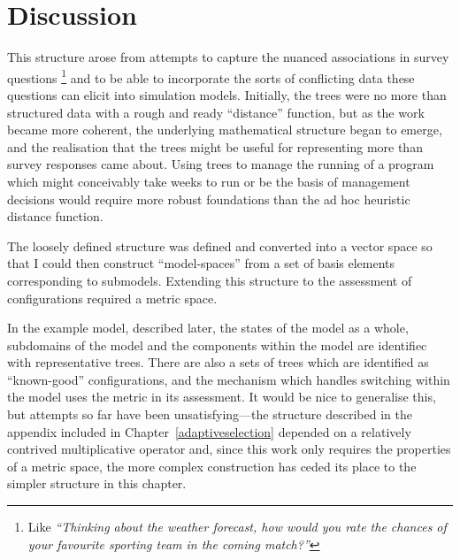 
\section{Discussion}

This structure arose from attempts to capture the nuanced associations
in survey questions \footnote{Like \emph{``Thinking about the weather
    forecast, how would you rate the chances of your favourite
    sporting team in the coming match?''}} and to be able to
incorporate the sorts of conflicting data these questions can elicit
into simulation models. Initially, the trees were no more than
structured data with a rough and ready ``distance'' function, but as
the work became more coherent, the underlying mathematical structure
began to emerge, and the realisation that the trees might be useful
for representing more than survey responses came about.  Using trees
to manage the running of a program which might conceivably take weeks
to run or be the basis of management decisions would require more
robust foundations than the ad hoc heuristic distance function.

The loosely defined structure was defined and converted into a vector
space so that I could then construct ``model-spaces'' from a set of basis
elements corresponding to submodels. Extending this structure to the
assessment of configurations required a metric space.

In the example model, described later, the states of the model as a
whole, subdomains of the model and the components within the model are
identifiec with representative trees.  There are also a sets of trees
which are identified as ``known-good'' configurations, and the
mechanism which handles switching within the model uses the metric in
its assessment.  It would be nice to generalise this, but attempts so
far have been unsatisfying---the structure described in the appendix
included in Chapter~\ref{adaptiveselection} depended on a relatively
contrived multiplicative operator and, since this work only requires the
properties of a metric space, the more complex construction has ceded
its place to the simpler structure in this chapter.



